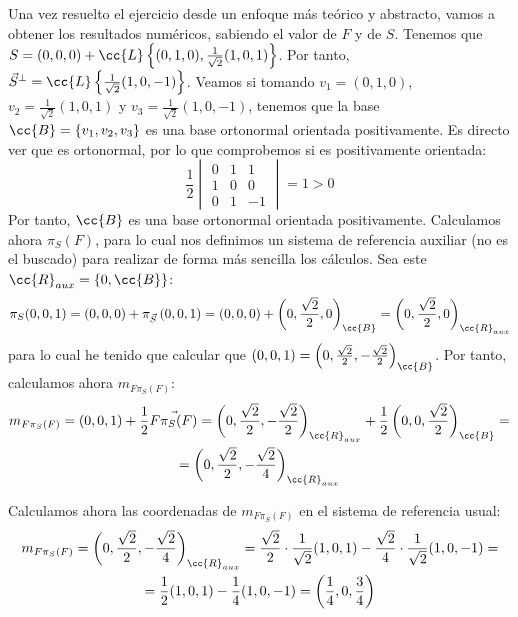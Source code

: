 \begin{ejercicio}
    Una vez resuelto el ejercicio desde un enfoque más teórico y abstracto, vamos a obtener los resultados numéricos, sabiendo el valor de $F$ y de $S$.
    Tenemos que $S=(0,0,0) + \cc{L}\left\{(0,1,0), \frac{1}{\sqrt{2}}(1,0,1)\right\}$. Por tanto, $\vec{S}^\perp=\cc{L}\left\{\frac{1}{\sqrt{2}}(1,0,-1)\right\}$.
    Veamos si tomando $v_1=(0,1,0)$, $v_2=\frac{1}{\sqrt{2}}(1,0,1)$ y $v_3=\frac{1}{\sqrt{2}}(1,0,-1)$, tenemos que la base $\cc{B}=\{v_1,v_2,v_3\}$ es una base ortonormal orientada positivamente.
    Es directo ver que es ortonormal, por lo que comprobemos si es positivamente orientada:
    \begin{equation*}
        \frac{1}{2}\begin{vmatrix}
            0 & 1 & 1 \\
            1 & 0 & 0 \\
            0 & 1 & -1
        \end{vmatrix} = 1 > 0
    \end{equation*}
    Por tanto, $\cc{B}$ es una base ortonormal orientada positivamente. Calculamos ahora $\pi_S(F)$, para lo cual nos definimos un sistema de referencia auxiliar (no es el buscado) para
    realizar de forma más sencilla los cálculos. Sea este $\cc{R}_{aux}=\{0,\cc{B}\}$:
    \begin{equation*}
        \pi_S(0,0,1) = (0,0,0) + \pi_{\vec{S}} \left(0,0,1\right) = (0,0,0) + \left(0, \frac{\sqrt{2}}{2}, 0\right)_{\cc{B}} = \left(0, \frac{\sqrt{2}}{2}, 0\right)_{\cc{R}_{aux}}
    \end{equation*}
    para lo cual he tenido que calcular que $(0,0,1)=\left(0, \frac{\sqrt{2}}{2}, -\frac{\sqrt{2}}{2}\right)_{\cc{B}}$. Por tanto, calculamos ahora $m_{F \pi_S(F)}$:
    \begin{multline*}
        m_{F \pi_S(F)} = (0,0,1) + \frac{1}{2}\vec{F\pi_S(F)} = \left(0, \frac{\sqrt{2}}{2}, -\frac{\sqrt{2}}{2}\right)_{\cc{R}_{aux}} + \frac{1}{2}\left(0, 0, \frac{\sqrt{2}}{2}\right)_{\cc{B}} =\\= \left(0, \frac{\sqrt{2}}{2}, -\frac{\sqrt{2}}{4}\right)_{\cc{R}_{aux}}
    \end{multline*}

    Calculamos ahora las coordenadas de $m_{F \pi_S(F)}$ en el sistema de referencia usual:
    \begin{multline*}
        m_{F \pi_S(F)} = \left(0, \frac{\sqrt{2}}{2}, -\frac{\sqrt{2}}{4}\right)_{\cc{R}_{aux}}
        = \frac{\sqrt{2}}{2}\cdot \frac{1}{\sqrt{2}}(1,0,1) - \frac{\sqrt{2}}{4}\cdot \frac{1}{\sqrt{2}}(1,0,-1)
        =\\= \frac{1}{2}(1,0,1) - \frac{1}{4}(1,0,-1) = \left(\frac{1}{4}, 0, \frac{3}{4}\right)
    \end{multline*}


\end{ejercicio}
